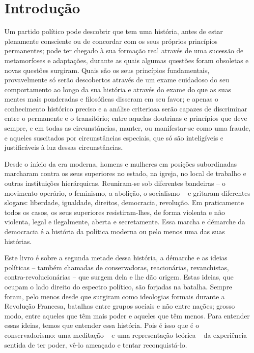 \chapter{Introdução}\label{Introdução}
 \par 
Um partido político pode descobrir que tem uma história, antes de estar plenamente consciente ou de concordar com os seus próprios princípios permanentes; pode ter chegado à sua formação real através de uma sucessão de metamorfoses e adaptações, durante as quais algumas questões foram obsoletas e novas questões surgiram. Quais são os seus princípios fundamentais, provavelmente só serão descobertos através de um exame cuidadoso do seu comportamento ao longo da sua história e através do exame do que as suas mentes mais ponderadas e filosóficas disseram em seu favor; e apenas o conhecimento histórico preciso e a análise criteriosa serão capazes de discriminar entre o permanente e o transitório; entre aquelas doutrinas e princípios que deve sempre, e em todas as circunstâncias, manter, ou manifestar-se como uma fraude, e aqueles suscitados por circunstâncias especiais, que só são inteligíveis e justificáveis ​​à luz dessas circunstâncias.
 \par 
Desde o início da era moderna, homens e mulheres em posições subordinadas marcharam contra os seus superiores no estado, na igreja, no local de trabalho e outras instituições hierárquicas. Reuniram-se sob diferentes bandeiras – o movimento operário, o feminismo, a abolição, o socialismo – e gritaram diferentes slogans: liberdade, igualdade, direitos, democracia, revolução. Em praticamente todos os casos, os seus superiores resistiram-lhes, de forma violenta e não violenta, legal e ilegalmente, aberta e secretamente. Essa marcha e démarche da democracia é a história da política moderna ou pelo menos uma das suas histórias.
 \par 
Este livro é sobre a segunda metade dessa história, a démarche e as ideias políticas – também chamadas de conservadoras, reacionárias, revanchistas, contra-revolucionárias – que surgem dela e lhe dão origem. Estas ideias, que ocupam o lado direito do espectro político, são forjadas na batalha. Sempre foram, pelo menos desde que surgiram como ideologias formais durante a Revolução Francesa, batalhas entre grupos sociais e não entre nações; grosso modo, entre aqueles que têm mais poder e aqueles que têm menos. Para entender essas ideias, temos que entender essa história. Pois é isso que é o conservadorismo: uma meditação – e uma representação teórica – da experiência sentida de ter poder, vê-lo ameaçado e tentar reconquistá-lo.
